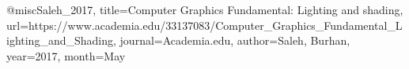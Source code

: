 @misc{Saleh_2017, 
title={Computer Graphics Fundamental: Lighting and shading},
 url={https://www.academia.edu/33137083/Computer_Graphics_Fundamental_Lighting_and_Shading}, 
 journal={Academia.edu}, 
 author={Saleh, Burhan},
  year={2017}, 
  month={May}
  } 